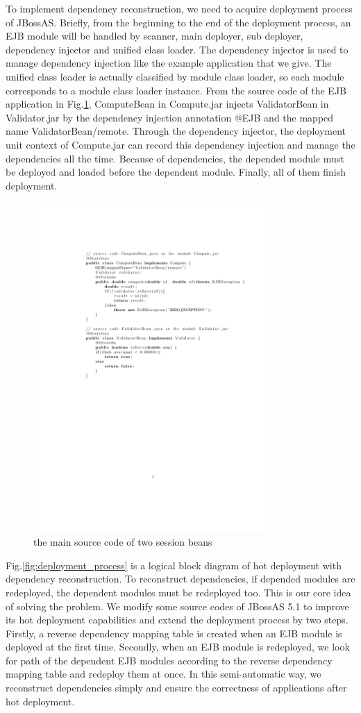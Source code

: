 \documentclass[conference]{IEEEtran}
\begin{document}
To implement dependency reconstruction, we need to acquire deployment process of JBossAS.
Briefly, from the beginning to the end of the deployment process, an EJB module will be handled by scanner, main deployer, sub deployer, dependency injector and unified class loader\cite{deployment_process}.
The dependency injector is used to manage dependency injection like the example application that we give.
The unified class loader is actually classified by module class loader, so each module corresponds to a module class loader instance.
From the source code of the EJB application in Fig.\ref{fig:ejb_source_code}, ComputeBean in Compute.jar injects ValidatorBean in Validator.jar by the dependency injection annotation @EJB and the mapped name ValidatorBean/remote.
Through the dependency injector, the deployment unit context of Compute.jar can record this dependency injection and manage the dependencies all the time.
Because of dependencies, the depended module must be deployed and loaded before the dependent module.
Finally, all of them finish deployment.

\begin{figure}[!t]
\centering
\includegraphics[width=3.5in]{ejb_source_code.pdf}
\caption{the main source code of two session beans}
\label{fig:ejb_source_code}
\end{figure}

Fig.\ref{fig:deployment_process} is a logical block diagram of hot deployment with dependency reconstruction.
To reconstruct dependencies, if depended modules are redeployed, the dependent modules must be redeployed too.
This is our core idea of solving the problem.
We modify some source codes of JBossAS 5.1 to improve its hot deployment capabilities and extend the deployment process by two steps.
Firstly, a reverse dependency mapping table is created when an EJB module is deployed at the first time.
Secondly, when an EJB module is redeployed, we look for path of the dependent EJB modules according to the reverse dependency mapping table and redeploy them at once. 
In this semi-automatic way, we reconstruct dependencies simply and ensure the correctness of applications after hot deployment.
\end{document}
